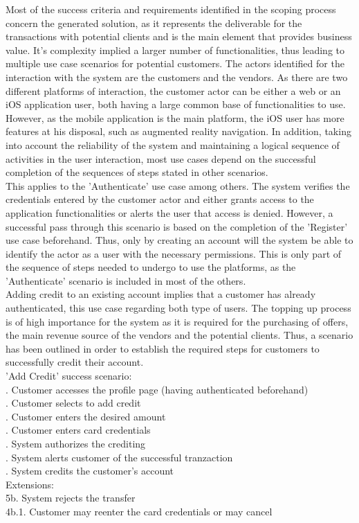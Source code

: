 Most of the success criteria and requirements identified in the scoping process concern the generated solution, as it represents the deliverable for the transactions with potential clients and is the main element that provides business value. It's complexity implied a larger number of functionalities, thus leading to multiple use case scenarios for potential customers. The actors identified for the interaction with the system are the customers and the vendors. As there are two different platforms of interaction, the customer actor can be either a web or an iOS application user, both having a large common base of functionalities to use. However, as the mobile application is the main platform, the iOS user has more features at his disposal, such as augmented reality navigation. In addition, taking into account the reliability of the system and maintaining a logical sequence of activities in the user interaction, most use cases depend on the successful completion of the sequences of steps stated in other scenarios.\\

This applies to the 'Authenticate' use case among others. The system verifies the credentials entered by the customer actor and either grants access to the application functionalities or alerts the user that access is denied. However, a successful pass through this scenario is based on the completion of the 'Register' use case beforehand. Thus, only by creating an account will the system be able to identify the actor as a user with the necessary permissions. This is only part of the sequence of steps needed to undergo to use the platforms, as the 'Authenticate' scenario is included in most of the others.\\

Adding credit to an existing account implies that a customer has already authenticated, this use case regarding both type of users. The topping up process is of high importance for the system as it is required for the purchasing of offers, the main revenue source of the vendors and the potential clients. Thus, a scenario has been outlined in order to establish the required steps for customers to successfully credit their account.\\

\noindent 'Add Credit' success scenario:\\
. Customer accesses the profile page (having authenticated beforehand)\\
. Customer selects to add credit\\
. Customer enters the desired amount\\
. Customer enters card credentials\\
. System authorizes the crediting\\
. System alerts customer of the successful tranzaction\\
. System credits the customer's account\\
Extensions:\\
\indent 5b. System rejects the transfer\\
\indent\indent 4b.1. Customer may reenter the card credentials or may cancel\\

